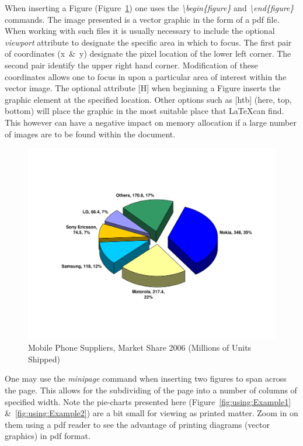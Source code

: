 When inserting a Figure (Figure~\ref{fig:using:MobilePhoneSuppliers2006MarketShare}) one uses the \emph{\textbackslash begin\{figure\}} and \emph{\textbackslash end\{figure\}} commands. The image presented is a vector graphic in the form of a pdf file. When working with such files it is usually necessary to include the optional \emph{viewport} attribute to designate the specific area in which to focus. The first pair of coordinates (x~\&~y) designate the pixel location of the lower left corner. The second pair identify the upper right hand corner. Modification of these coordinates allows one to focus in upon a particular area of interest within the vector image. The optional attribute [H] when beginning a Figure inserts the graphic element at the specified location. Other options such as [htb] (here, top, bottom) will place the graphic in the most suitable place that \LaTeX \space can find. This however can have a negative impact on memory allocation if a large number of images are to be found within the document.


\begin{figure}[H]
\centering
\includegraphics*[viewport= 80 130 725 505, width=.4\linewidth]{usingLatex/images/MobileMarketShare2006.pdf}
\caption{Mobile Phone Suppliers, Market Share 2006 (Millions of
Units Shipped)}
\label{fig:using:MobilePhoneSuppliers2006MarketShare}
\end{figure}

One may use the \emph{minipage} command when inserting two figures to span across the page. This allows for the subdividing of the page into a number of columns of specified width. Note the pie-charts presented here (Figure~\ref{fig:using:Example1} \&~\ref{fig:using:Example2}) are a bit small for viewing as printed matter. Zoom in on them using a pdf reader to see the advantage of printing diagrams (vector graphics) in pdf format.

